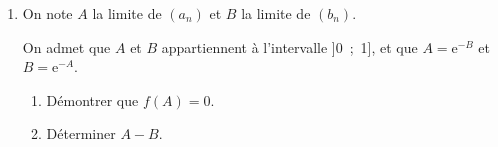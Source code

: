 \documentclass[10pt]{article}
\begin{document}
\begin{enumerate}
\begin{enumerate}
		\item En déduire que les suites $\left(a_n\right)$ et $\left(b_n\right)$ sont convergentes.
	\end{enumerate}	
\item On note $A$ la limite de $\left(a_n\right)$ et $B$ la limite de $\left(b_n\right)$.

On admet que $A$ et $B$ appartiennent à l'intervalle ]0~;~1], et que $A = \text{e}^{-B}$ et $B = \text{e}^{-A}$.
	\begin{enumerate}
		\item Démontrer que $f(A) = 0$.
		\item Déterminer $A - B$.
	\end{enumerate}
\end{enumerate}
\end{document}

